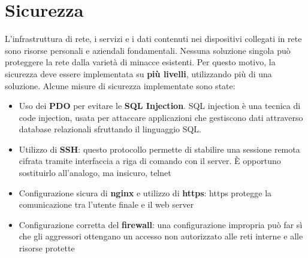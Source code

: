 
\section{Sicurezza}
L'infrastruttura di rete, i servizi e i dati contenuti nei dispositivi collegati in rete sono risorse personali e aziendali fondamentali. Nessuna soluzione singola può proteggere la rete dalla varietà di minacce esistenti. Per questo motivo, la sicurezza deve essere implementata su \textbf{più livelli}, utilizzando più di una soluzione. \clearpage Alcune misure di sicurezza implementate sono state:
\begin{itemize}
    \item Uso dei \textbf{PDO} per evitare le \textbf{SQL Injection}. SQL injection è una tecnica di code injection, usata per attaccare applicazioni che gestiscono dati attraverso database relazionali sfruttando il linguaggio SQL. \cite{sql_injection_php}
    \item Utilizzo di \textbf{SSH}: questo protocollo permette di stabilire una sessione remota cifrata tramite interfaccia a riga di comando con il server. È opportuno sostituirlo all'analogo, ma insicuro, telnet
    \item Configurazione sicura di \textbf{nginx} e utilizzo di \textbf{https}: https protegge la comunicazione tra l'utente finale e il web server
    \item Configurazione corretta del \textbf{firewall}: una configurazione impropria può far sì che gli aggressori ottengano un accesso non autorizzato alle reti interne e alle risorse protette
\end{itemize}

